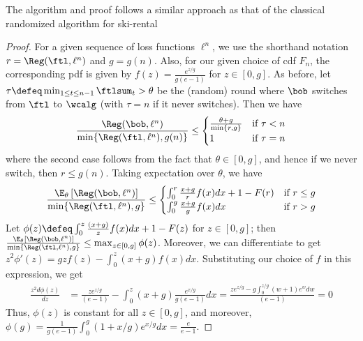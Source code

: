 The algorithm and proof follows a similar approach as that of the classical randomized algorithm for ski-rental~\cite{karlin1994competitive}
\begin{proof}
For a given sequence of loss functions $\ell^n$, we use the shorthand notation $r= \Reg(\ftl,\ell^n)$ and $g=g(n)$.
Also, for our given choice of cdf $F_n$, the corresponding pdf is given by $f(z) = \frac{e^{z/g}}{g(e-1)}$ for $z\in[0,g]$. 
As before, let $\tau \defeq \min_{1 \le t \le n-1} \ftlsum_t > \theta$ be the (random) round where $\bob$ switches from $\ftl$ to $\wcalg$ (with $\tau=n$ if it never switches). Then we have
\begin{align*}
\frac{\Reg(\bob,\ell^n)}{\min\{\Reg(\ftl,\ell^n),g(n)\}}\leq \begin{cases} 
   \frac{\theta + g}{\min\{r,g\}} & \text{if } \tau < n \\
   1       & \text{if } \tau = n
  \end{cases}
\end{align*}
where the second case follows from the fact that $\theta\in[0,g]$, and hence if we never switch, then $r\le g(n)$. 
Taking expectation over $\theta$, we have
\begin{align*}
\frac{\E_{\theta}\left[\Reg(\bob,\ell^n)\right]}{\min\{\Reg(\ftl,\ell^n),g\}}\le 
\begin{cases} 
   \int_0^r   \frac{x + g}{r}f(x)dx + 1 - F(r)  & \text{if } r \le g \\
   \int_0^g   \frac{x + g}{g}f(x)dx        & \text{if } r > g
  \end{cases}
\end{align*}
Let $\phi(z) \defeq  \int_0^z \frac{(x + g)}{z}f(x)dx + 1 - F(z) $ for $z\in[0,g]$; then $\frac{\E_{\theta}\left[\Reg(\bob,\ell^n)\right]}{\min\{\Reg(\ftl,\ell^n),g\}} \leq \max_{z\in[0,g]}\phi(z)$. Moreover, we can differentiate to get $z^2\phi'(z)= gzf(z) - \int_0^z(x + g)f(x)dx$. Substituting our choice of $f$ in this expression, we get
\begin{align*}
\frac{z^2d\phi(z)}{dz} &= \frac{ze^{z/g}}{(e-1)} - \int_0^z(x + g)\frac{e^{x/g}}{g(e-1)}dx
=\frac{ze^{z/g} - g\int_0^{z/g}(w + 1)e^{w}dw}{(e-1)}=0
\end{align*}
Thus, $\phi(z)$ is constant for all $z\in[0,g]$, and moreover, $\phi(g) = \frac{1}{g(e-1)}\int_0^g(1+x/g)e^{x/g}dx = \frac{e}{e-1}$.
\end{proof}


\begin{remark} \label{rem:SkiRentalLB}
    
\end{remark}